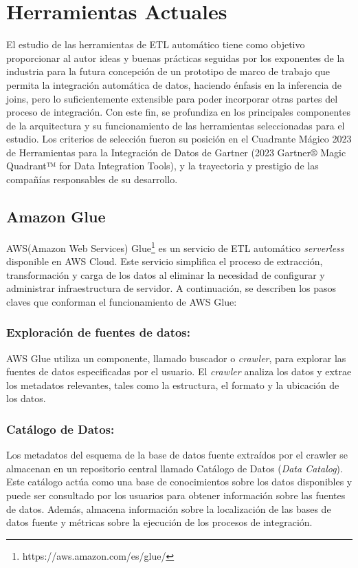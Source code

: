 \section{Herramientas Actuales} \label{section:actual_tools}

El estudio de las herramientas de ETL automático tiene como objetivo proporcionar al autor ideas y buenas 
prácticas seguidas por los exponentes de la industria para la futura concepción de un prototipo de marco de 
trabajo que permita la integración automática de datos, haciendo énfasis en la inferencia de joins, pero lo 
suficientemente extensible para poder incorporar otras partes del proceso de integración. Con este fin, se 
profundiza en los principales componentes de la arquitectura y su funcionamiento de las herramientas seleccionadas 
para el estudio. Los criterios de selección fueron su posición en el Cuadrante Mágico 2023 de Herramientas para 
la Integración de Datos de Gartner (2023 Gartner® Magic Quadrant™ for Data Integration Tools)\cite{magic_q}, y la 
trayectoria y prestigio de las compañías responsables de su desarrollo.

\subsection{Amazon Glue}

AWS(Amazon Web Services) Glue\footnote{https://aws.amazon.com/es/glue/} es un servicio de ETL automático \emph{serverless} 
disponible en AWS Cloud. Este servicio simplifica el proceso de 
extracción, transformación y carga de los datos al eliminar la necesidad de configurar y administrar infraestructura de 
servidor. A continuación, se describen los pasos claves que conforman el funcionamiento de AWS Glue\cite{noauthor_aws_nodate}:

\subsubsection{Exploración de fuentes de datos:}
AWS Glue utiliza un componente, llamado buscador o \emph{crawler}, para explorar las fuentes de datos 
especificadas por el usuario. El \emph{crawler} analiza los datos y extrae los metadatos relevantes, tales como la estructura, el 
formato y la ubicación de los datos.

\subsubsection{Catálogo de Datos:}
Los metadatos del esquema de la base de datos fuente extraídos por el crawler se almacenan en un repositorio central llamado Catálogo de 
Datos (\emph{Data Catalog}). Este catálogo actúa como una base de conocimientos sobre los datos disponibles y puede ser 
consultado por los usuarios para obtener información sobre las fuentes de datos. Además, almacena información 
sobre la localizaci\'on de las bases de datos fuente y m\'etricas sobre la ejecución de los procesos 
de integración\cite{noauthor_aws_nodate}.

